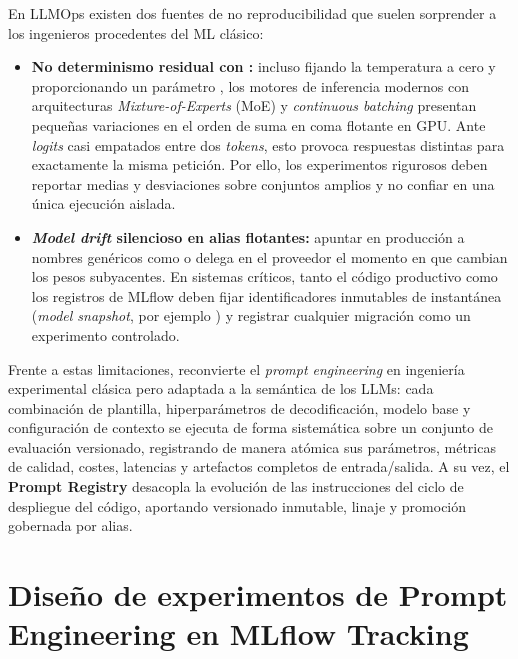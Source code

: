 \begin{warningbox}[El mito de \code{temperature=0} y el \textit{model drift} silencioso]
En LLMOps existen dos fuentes de no reproducibilidad que suelen sorprender a los ingenieros procedentes del ML clásico:
\begin{itemize}
  \item \textbf{No determinismo residual con :} incluso fijando la temperatura a cero y proporcionando un parámetro , los motores de inferencia modernos con arquitecturas \textit{Mixture-of-Experts} (MoE) y \textit{continuous batching} presentan pequeñas variaciones en el orden de suma en coma flotante en GPU. Ante \textit{logits} casi empatados entre dos \textit{tokens}, esto provoca respuestas distintas para exactamente la misma petición. Por ello, los experimentos rigurosos deben reportar medias y desviaciones sobre conjuntos amplios y no confiar en una única ejecución aislada.
  \item \textbf{\textit{Model drift} silencioso en alias flotantes:} apuntar en producción a nombres genéricos como  o  delega en el proveedor el momento en que cambian los pesos subyacentes. En sistemas críticos, tanto el código productivo como los registros de MLflow deben fijar identificadores inmutables de instantánea (\textit{model snapshot}, por ejemplo ) y registrar cualquier migración como un experimento controlado.
\end{itemize}
\end{warningbox}

Frente a estas limitaciones,  reconvierte el \textit{prompt engineering} en ingeniería experimental clásica pero adaptada a la semántica de los LLMs: cada combinación de plantilla, hiperparámetros de decodificación, modelo base y configuración de contexto se ejecuta de forma sistemática sobre un conjunto de evaluación versionado, registrando de manera atómica sus parámetros, métricas de calidad, costes, latencias y artefactos completos de entrada/salida. A su vez, el \textbf{Prompt Registry} desacopla la evolución de las instrucciones del ciclo de despliegue del código, aportando versionado inmutable, linaje y promoción gobernada por alias.

\section[Experimentos de Prompting en Tracking]{Diseño de experimentos de Prompt Engineering en MLflow Tracking}\label{sec:exp-prompt-tracking}

